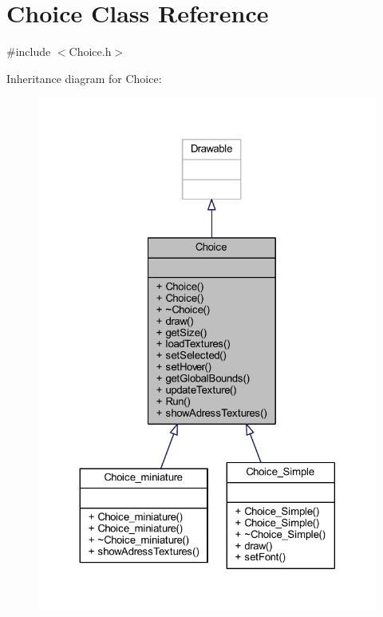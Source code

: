 \hypertarget{class_choice}{}\section{Choice Class Reference}
\label{class_choice}


{\ttfamily \#include $<$Choice.\+h$>$}



Inheritance diagram for Choice\+:\nopagebreak
\begin{figure}[H]
\begin{center}
\leavevmode
\includegraphics[width=324pt]{class_choice__inherit__graph}
\end{center}
\end{figure}



